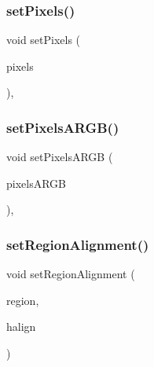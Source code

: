 \subsubsection{\texorpdfstring{set\+Pixels()}{setPixels()}}
{\footnotesize\ttfamily void set\+Pixels (\begin{DoxyParamCaption}\item[{const Grid$<$ int $>$ \&}]{pixels }\end{DoxyParamCaption})\hspace{0.3cm}{\ttfamily [override]}, {\ttfamily [inherited]}}

\mbox{\label{classGForwardDrawingSurface_a6573789f75baf0b21122763e9a87c8df}} 
\subsubsection{\texorpdfstring{set\+Pixels\+A\+R\+G\+B()}{setPixelsARGB()}}
{\footnotesize\ttfamily void set\+Pixels\+A\+R\+GB (\begin{DoxyParamCaption}\item[{const Grid$<$ int $>$ \&}]{pixels\+A\+R\+GB }\end{DoxyParamCaption})\hspace{0.3cm}{\ttfamily [override]}, {\ttfamily [inherited]}}

\mbox{\label{classGWindow_a96e9f5593c0193bbdc7ae99945b9cf5f}} 
\subsubsection{\texorpdfstring{set\+Region\+Alignment()}{setRegionAlignment()}\hspace{0.1cm}{\footnotesize\ttfamily [1/5]}}
{\footnotesize\ttfamily void set\+Region\+Alignment (\begin{DoxyParamCaption}\item[{\mbox{\hyperlink{classGWindow_a81a01a86de31071a92e6cce0bab9bc4b}{Region}}}]{region,  }\item[{Horizontal\+Alignment}]{halign }\end{DoxyParamCaption})\hspace{0.3cm}{\ttfamily [virtual]}}



